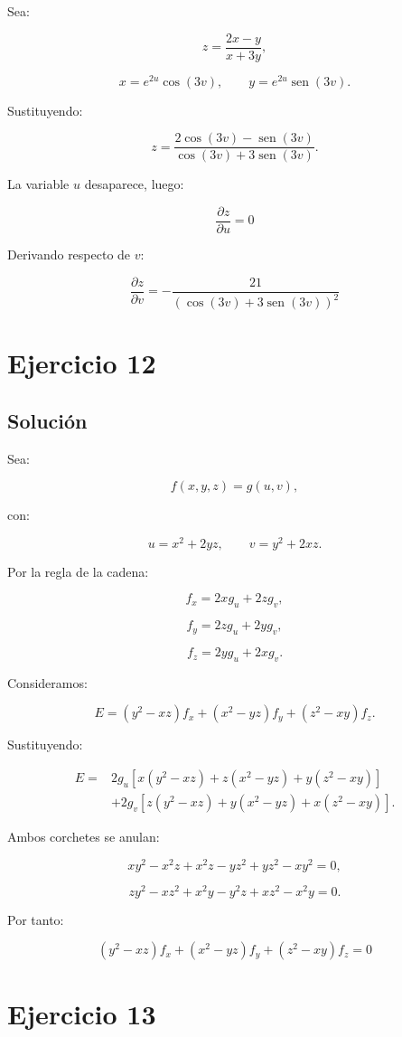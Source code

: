 \documentclass[11pt,a4paper]{article}
\newcommand{\sen}{\operatorname{sen}}
\begin{document}
Sea:

\[
z=
\frac{2x-y}{x+3y},
\]

\[
x=e^{2u}\cos(3v),
\qquad
y=e^{2u}\sen(3v).
\]

Sustituyendo:

\[
z
=
\frac{
2\cos(3v)-\sen(3v)
}{
\cos(3v)+3\sen(3v)
}.
\]

La variable \(u\) desaparece, luego:

\[
\boxed{
\frac{\partial z}{\partial u}=0
}
\]

Derivando respecto de \(v\):

\[
\boxed{
\frac{\partial z}{\partial v}
=
-\frac{21}
{\left(
\cos(3v)+3\sen(3v)
\right)^2}
}
\]

\section{Ejercicio 12}
\subsection{Solución}

Sea:

\[
f(x,y,z)
=
g(u,v),
\]

con:

\[
u=x^2+2yz,
\qquad
v=y^2+2xz.
\]

Por la regla de la cadena:

\[
f_x
=
2xg_u+2zg_v,
\]

\[
f_y
=
2zg_u+2yg_v,
\]

\[
f_z
=
2yg_u+2xg_v.
\]

Consideramos:

\[
E
=
(y^2-xz)f_x
+
(x^2-yz)f_y
+
(z^2-xy)f_z.
\]

Sustituyendo:

\[
\begin{aligned}
E
={}&
2g_u
\left[
x(y^2-xz)
+
z(x^2-yz)
+
y(z^2-xy)
\right]\\
&+
2g_v
\left[
z(y^2-xz)
+
y(x^2-yz)
+
x(z^2-xy)
\right].
\end{aligned}
\]

Ambos corchetes se anulan:

\[
x y^2-x^2z+x^2z-yz^2+yz^2-xy^2=0,
\]

\[
zy^2-xz^2+x^2y-y^2z+xz^2-x^2y=0.
\]

Por tanto:

\[
\boxed{
(y^2-xz)f_x
+
(x^2-yz)f_y
+
(z^2-xy)f_z
=
0
}
\]

\section{Ejercicio 13}
\end{document}
